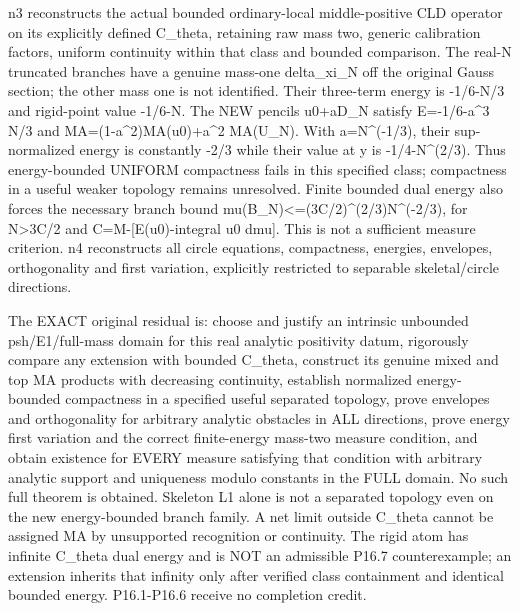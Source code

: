 \documentclass[11pt]{article}
\begin{document}
n3 reconstructs the actual bounded ordinary-local middle-positive CLD operator on its explicitly defined C\_theta, retaining raw mass two, generic calibration factors, uniform continuity within that class and bounded comparison. The real-N truncated branches have a genuine mass-one delta\_xi\_N off the original Gauss section; the other mass one is not identified. Their three-term energy is -1/6-N/3 and rigid-point value -1/6-N. The NEW pencils u0+aD\_N satisfy E=-1/6-a\textasciicircum{}3 N/3 and MA=(1-a\textasciicircum{}2)MA(u0)+a\textasciicircum{}2 MA(U\_N). With a=N\textasciicircum{}(-1/3), their sup-normalized energy is constantly -2/3 while their value at y is -1/4-N\textasciicircum{}(2/3). Thus energy-bounded UNIFORM compactness fails in this specified class; compactness in a useful weaker topology remains unresolved. Finite bounded dual energy also forces the necessary branch bound mu(B\_N)<=(3C/2)\textasciicircum{}(2/3)N\textasciicircum{}(-2/3), for N>3C/2 and C=M-[E(u0)-integral u0 dmu]. This is not a sufficient measure criterion. n4 reconstructs all circle equations, compactness, energies, envelopes, orthogonality and first variation, explicitly restricted to separable skeletal/circle directions.

The EXACT original residual is: choose and justify an intrinsic unbounded psh/E1/full-mass domain for this real analytic positivity datum, rigorously compare any extension with bounded C\_theta, construct its genuine mixed and top MA products with decreasing continuity, establish normalized energy-bounded compactness in a specified useful separated topology, prove envelopes and orthogonality for arbitrary analytic obstacles in ALL directions, prove energy first variation and the correct finite-energy mass-two measure condition, and obtain existence for EVERY measure satisfying that condition with arbitrary analytic support and uniqueness modulo constants in the FULL domain. No such full theorem is obtained. Skeleton L1 alone is not a separated topology even on the new energy-bounded branch family. A net limit outside C\_theta cannot be assigned MA by unsupported recognition or continuity. The rigid atom has infinite C\_theta dual energy and is NOT an admissible P16.7 counterexample; an extension inherits that infinity only after verified class containment and identical bounded energy. P16.1-P16.6 receive no completion credit.
\end{document}
